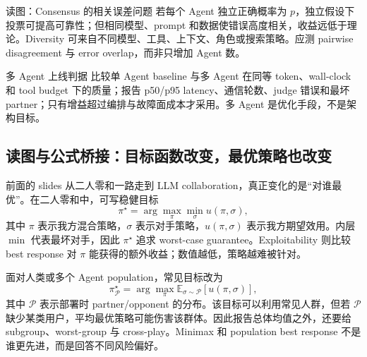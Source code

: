 
\begin{knowledgebox}{读图：Consensus 的相关误差问题}
若每个 Agent 独立正确概率为 $p$，独立假设下投票可提高可靠性；但相同模型、prompt 和数据使错误高度相关，收益远低于理论。Diversity 可来自不同模型、工具、上下文、角色或搜索策略。应测 pairwise disagreement 与 error overlap，而非只增加 Agent 数。
\end{knowledgebox}

\begin{importantbox}{多 Agent 上线判据}
比较单 Agent baseline 与多 Agent 在同等 token、wall-clock 和 tool budget 下的质量；报告 p50/p95 latency、通信轮数、judge 错误和最坏 partner；只有增益超过编排与故障面成本才采用。多 Agent 是优化手段，不是架构目标。
\end{importantbox}

\subsection{读图与公式桥接：目标函数改变，最优策略也改变}

前面的 slides 从二人零和一路走到 LLM collaboration，真正变化的是“对谁最优”。在二人零和中，可写稳健目标
\[
\pi^\star=\arg\max_{\pi}\min_{\sigma}u(\pi,\sigma),
\]
其中 $\pi$ 表示我方混合策略，$\sigma$ 表示对手策略，$u(\pi,\sigma)$ 表示我方期望效用。内层 $\min$ 代表最坏对手，因此 $\pi^\star$ 追求 worst-case guarantee。Exploitability 则比较 best response 对 $\pi$ 能获得的额外收益；数值越低，策略越难被针对。

面对人类或多个 Agent population，常见目标改为
\[
\pi^\star_{\mathcal P}
=\arg\max_{\pi}\mathbb E_{\sigma\sim\mathcal P}[u(\pi,\sigma)],
\]
其中 $\mathcal P$ 表示部署时 partner/opponent 的分布。该目标可以利用常见人群，但若 $\mathcal P$ 缺少某类用户，平均最优策略可能伤害该群体。因此报告总体均值之外，还要给 subgroup、worst-group 与 cross-play。Minimax 和 population best response 不是谁更先进，而是回答不同风险偏好。

